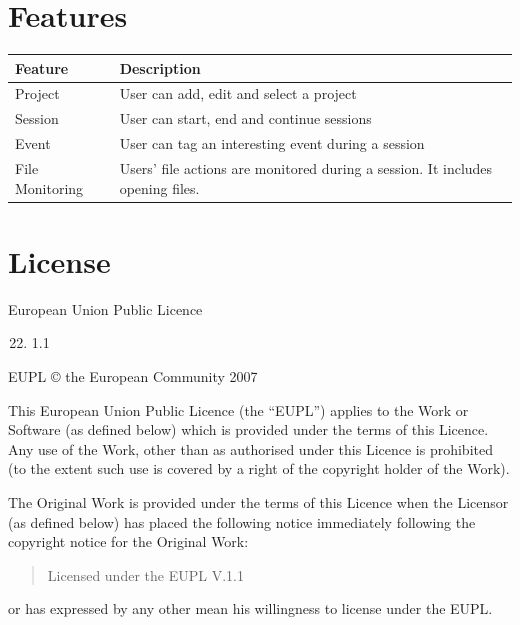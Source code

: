 \documentclass[letterpaper,10pt,english]{sphinxmanual}
\begin{document}
\chapter{Features}
\label{features::doc}\label{features:features}
\begin{tabulary}{\linewidth}{|L|L|}
\hline
\textbf{
Feature
} & \textbf{
Description
}\\\hline

Project
 & 
User can add, edit and select a project
\\\hline

Session
 & 
User can start, end and continue sessions
\\\hline

Event
 & 
User can tag an interesting event during  a session
\\\hline

File Monitoring
 & 
Users' file actions are monitored during a session. It includes opening files.
\\\hline
\end{tabulary}



\chapter{License}
\label{license::doc}\label{license:license}
European Union Public Licence
\begin{enumerate}
\setcounter{enumi}{21}
\item {} 
1.1

\end{enumerate}

EUPL © the European Community 2007

This European Union Public Licence (the “EUPL”) applies to the Work or Software
(as defined below) which is provided under the terms of this Licence. Any use of the
Work, other than as authorised under this Licence is prohibited (to the extent such use
is covered by a right of the copyright holder of the Work).

The Original Work is provided under the terms of this Licence when the Licensor (as
defined below) has placed the following notice immediately following the copyright
notice for the Original Work:
\begin{quote}

Licensed under the EUPL V.1.1
\end{quote}

or has expressed by any other mean his willingness to license under the EUPL.
\end{document}
